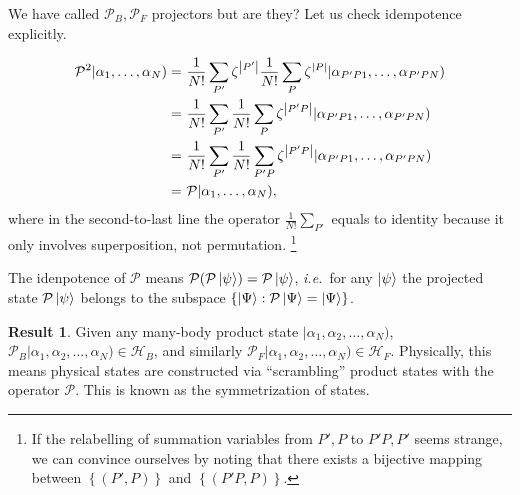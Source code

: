 \documentclass{article}
\theoremstyle{definition}
\newtheorem{res}{Result}[section]
\theoremstyle{plain}
\numberwithin{equation}{section}
\begin{document}
We have called $\mathcal{P}_{B}, \mathcal{P}_{F}$ projectors but are they? 
Let us check idempotence explicitly.

\begin{align*}
    \mathcal{P}^{2}|\alpha_{1}, \ldots ,\alpha_{N})
    =&\ 
    \frac{1}{N!}\sum_{P'}\zeta^{\abs{P'}}
    \frac{1}{N!}\sum_{P}\zeta^{\abs{P}}
    |\alpha_{P'P1}, \ldots ,\alpha_{P'PN})
    \\
    =&\ 
    \frac{1}{N!}\sum_{P'}
    \frac{1}{N!}\sum_{P}\zeta^{\abs{P'P}}
    |\alpha_{P'P1}, \ldots ,\alpha_{P'PN})
    \\
    =&\ 
    \frac{1}{N!}\sum_{P'}
    \frac{1}{N!}\sum_{P'P}
    \zeta^\abs{P'P}
    |\alpha_{P'P1}, \ldots ,\alpha_{P'PN})
    \\
    =&\ 
    \mathcal{P} |\alpha_1, \ldots ,\alpha_{N}),
\end{align*}
where in the second-to-last line the operator $\frac{1}{N!}\sum_{P'}$ 
equals to identity because it only involves superposition, not 
permutation. 
\footnote{If the relabelling of summation variables from $P',P$ to 
$P'P, P'$ seems strange, we can convince ourselves by noting that there 
exists a bijective mapping between $\left\{ (P',P) \right\}$ and 
$\left\{ (P'P, P) \right\}$. }

    The idenpotence of $\mathcal{P}$ means 
    $\mathcal{P} (\mathcal{P} \ket{\psi}) = \mathcal{P} \ket{\psi}$, \textit{i.e.}~for 
    any $\ket{\psi}$ the projected state $\mathcal{P} \ket{\psi}$ 
    belongs to the subspace $\{\ket{\Psi} : \mathcal{P} \ket{\Psi} = \ket{\Psi}\}$. 

\begin{graybox}
\begin{res}
    Given any many-body product state $|\alpha_1,\alpha_2, \ldots ,\alpha_{N})$, 
    $\mathcal{P}_{B}|\alpha_1,\alpha_2, \ldots ,\alpha_{N}) \in \mathcal{H}_{B}$, 
    and similarly 
    $\mathcal{P}_{F}|\alpha_1,\alpha_2, \ldots ,\alpha_{N}) \in \mathcal{H}_{F}$. 
    Physically, this means physical states are 
    constructed via ``scrambling'' product states with the 
    operator $\mathcal{P}$.
    This is known as the symmetrization of states.
\end{res}
\end{graybox}
\end{document}
